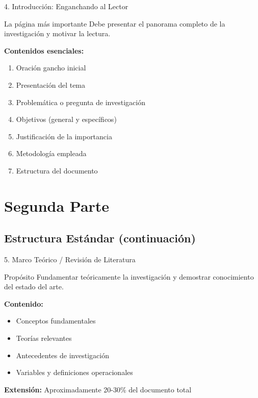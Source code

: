 \documentclass[xcolor=table,aspectratio=169,11pt]{beamer}
\begin{document}
	\begin{frame}{4. Introducción: Enganchando al Lector}
		\begin{alertblock}{La página más importante}
			Debe presentar el panorama completo de la investigación y motivar la lectura.
		\end{alertblock}
		
		\textbf{Contenidos esenciales:}
		\begin{enumerate}
			\item Oración gancho inicial
			\item Presentación del tema
			\item Problemática o pregunta de investigación
			\item Objetivos (general y específicos)
			\item Justificación de la importancia
			\item Metodología empleada
			\item Estructura del documento
		\end{enumerate}
	\end{frame}
	
	\section{Segunda Parte}
	
	\subsection{Estructura Estándar (continuación)}
	
	\begin{frame}{5. Marco Teórico / Revisión de Literatura}
		\begin{block}{Propósito}
			Fundamentar teóricamente la investigación y demostrar conocimiento del estado del arte.
		\end{block}
		
		\textbf{Contenido:}
		\begin{itemize}
			\item Conceptos fundamentales
			\item Teorías relevantes
			\item Antecedentes de investigación
			\item Variables y definiciones operacionales
		\end{itemize}
		
		\vspace{0.3cm}
		\textbf{Extensión:} Aproximadamente 20-30\% del documento total
	\end{frame}
	
\end{document}
